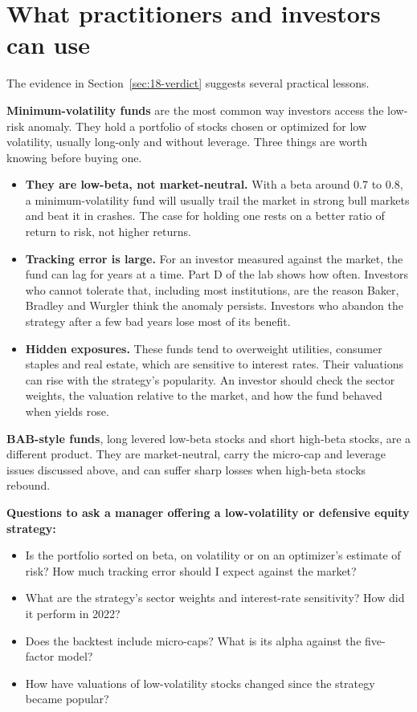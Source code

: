 \section{What practitioners and investors can use}
\label{sec:18-investors}

The evidence in Section~\ref{sec:18-verdict} suggests several practical lessons.

\textbf{Minimum-volatility funds} are the most common way investors access the low-risk anomaly. They hold a portfolio of stocks chosen or optimized for low volatility, usually long-only and without leverage. Three things are worth knowing before buying one.

\begin{itemize}
  \item \textbf{They are low-beta, not market-neutral.} With a beta around 0.7 to 0.8, a minimum-volatility fund will usually trail the market in strong bull markets and beat it in crashes. The case for holding one rests on a better ratio of return to risk, not higher returns.
  \item \textbf{Tracking error is large.} For an investor measured against the market, the fund can lag for years at a time. Part D of the lab shows how often. Investors who cannot tolerate that, including most institutions, are the reason Baker, Bradley and Wurgler think the anomaly persists. Investors who abandon the strategy after a few bad years lose most of its benefit.
  \item \textbf{Hidden exposures.} These funds tend to overweight utilities, consumer staples and real estate, which are sensitive to interest rates. Their valuations can rise with the strategy's popularity. An investor should check the sector weights, the valuation relative to the market, and how the fund behaved when yields rose.
\end{itemize}

\textbf{BAB-style funds}, long levered low-beta stocks and short high-beta stocks, are a different product. They are market-neutral, carry the micro-cap and leverage issues discussed above, and can suffer sharp losses when high-beta stocks rebound.

\textbf{Questions to ask a manager offering a low-volatility or defensive equity strategy:}

\begin{itemize}
  \item Is the portfolio sorted on beta, on volatility or on an optimizer's estimate of risk? How much tracking error should I expect against the market?
  \item What are the strategy's sector weights and interest-rate sensitivity? How did it perform in 2022?
  \item Does the backtest include micro-caps? What is its alpha against the five-factor model?
  \item How have valuations of low-volatility stocks changed since the strategy became popular?
\end{itemize}

